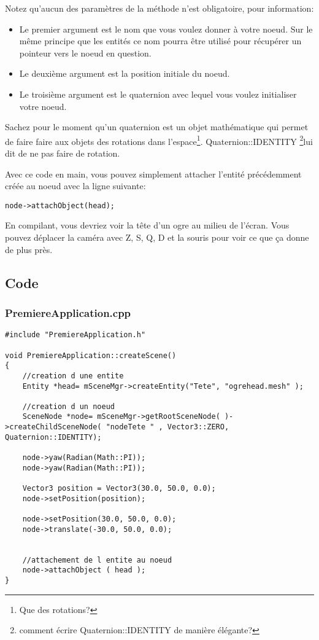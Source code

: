 Notez qu'aucun des param\`etres de la m\'ethode n'est obligatoire, pour information:
\begin{itemize}
\item Le premier argument est le nom que vous voulez donner \`{a} votre noeud. Sur le m\^eme principe que les entit\'es ce nom pourra \^etre utilis\'e pour r\'ecup\'erer un pointeur vers le noeud en question. 
\item Le deuxi\`eme argument est la position initiale du noeud.
\item Le troisi\`eme argument est le quaternion avec lequel vous voulez initialiser votre noeud.
\end{itemize}
	

Sachez pour le moment qu'un quaternion est un objet math\'ematique qui permet de faire faire aux objets des rotations dans l'espace\footnote{Que des rotations?}. Quaternion::IDENTITY \footnote{comment \'ecrire Quaternion::IDENTITY de manière \'el\'egante?}lui dit de ne pas faire de rotation.\newline

Avec ce code en main, vous pouvez simplement attacher l'entit\'e pr\'ec\'edemment cr\'e\'ee au noeud avec la ligne suivante:

\begin{lstlisting}
node->attachObject(head);
\end{lstlisting}

En compilant, vous devriez voir la t\^ete d'un ogre au milieu de l'\'ecran. Vous pouvez d\'eplacer la cam\'era avec Z, S, Q, D et la souris pour voir ce que \c{c}a donne de plus pr\`es.



\subsection{Code}

\subsubsection{PremiereApplication.cpp}
\begin{lstlisting}[caption={PremiereApplication.cpp: Instanciation d'entit\'e}]
#include "PremiereApplication.h"

void PremiereApplication::createScene()
{
    //creation d une entite
    Entity *head= mSceneMgr->createEntity("Tete", "ogrehead.mesh" );
    
    //creation d un noeud
    SceneNode *node= mSceneMgr->getRootSceneNode( )->createChildSceneNode( "nodeTete " , Vector3::ZERO, Quaternion::IDENTITY);
    
    node->yaw(Radian(Math::PI));
    node->yaw(Radian(Math::PI));

    Vector3 position = Vector3(30.0, 50.0, 0.0);
    node->setPosition(position);

    node->setPosition(30.0, 50.0, 0.0); 
    node->translate(-30.0, 50.0, 0.0); 
    
    
    //attachement de l entite au noeud
    node->attachObject ( head );
}
\end{lstlisting}








